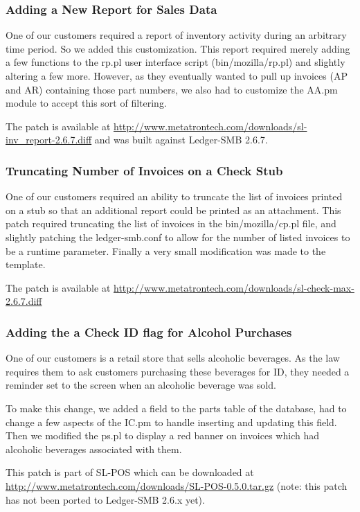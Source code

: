 \documentclass{article}
\begin{document}
\subsubsection{Adding a New Report for Sales Data}
One of our customers required a report of inventory activity during an arbitrary
time period.  So we added this customization.  This report required merely
adding a few functions to the rp.pl user interface script (bin/mozilla/rp.pl)
and slightly altering a few more.
However, as they eventually wanted to pull up invoices (AP and AR) containing
those part numbers, we also had to customize the AA.pm module to accept this
sort of filtering.

The patch is available at
\url{http://www.metatrontech.com/downloads/sl-inv\_report-2.6.7.diff} and was
built against Ledger-SMB 2.6.7.

\subsubsection{Truncating Number of Invoices on a Check Stub}

One of our customers required an ability to truncate the list of invoices 
printed on a stub so that an additional report could be printed as an
attachment.  This patch required truncating the list of invoices in the
bin/mozilla/cp.pl file, and slightly patching the ledger-smb.conf to allow for
the number of listed invoices to be a runtime parameter.  Finally a very small
modification was made to the template.

The patch is available at
\url{http://www.metatrontech.com/downloads/sl-check-max-2.6.7.diff}

\subsubsection{Adding the a Check ID flag for Alcohol Purchases}

One of our customers is a retail store that sells alcoholic beverages.  As the
law requires them to ask customers purchasing these beverages for ID, they
needed a reminder set to the screen when an alcoholic beverage was sold.

To make this change, we added a field to the parts table of the database, had to
change a few aspects of the IC.pm to handle inserting and updating this field.
Then we modified the ps.pl to display a red banner on invoices which had
alcoholic beverages associated with them.

This patch is part of SL-POS which can be downloaded at
\url{http://www.metatrontech.com/downloads/SL-POS-0.5.0.tar.gz} (note:  this
patch has not been ported to Ledger-SMB 2.6.x yet).
\end{document}
